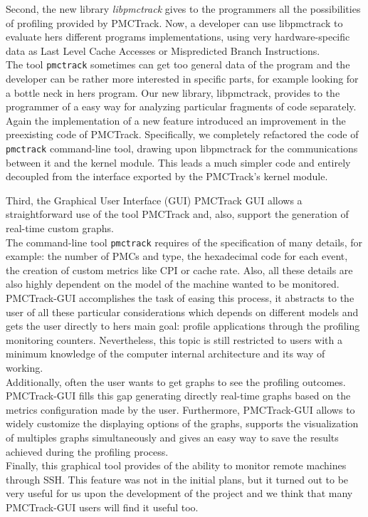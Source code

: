 Second, the new library \textit{libpmctrack} gives to the programmers all the possibilities of profiling provided by PMCTrack. Now, a developer can use libpmctrack to evaluate hers different programs implementations, using very hardware-specific data as Last Level Cache Accesses or Mispredicted Branch Instructions.\\%
The tool \texttt{pmctrack} sometimes can get too general data of the program and the developer can be rather more interested in specific parts, for example looking for a bottle neck in hers program. Our new library, libpmctrack, provides to the programmer of a easy way for analyzing particular fragments of code separately.\\%
Again the implementation of a new feature introduced an improvement in the preexisting code of PMCTrack. Specifically, we completely refactored the code of \texttt{pmctrack} command-line tool, drawing upon libpmctrack for the communications between it and the kernel module. This leads a much simpler code and entirely decoupled from the interface exported by the PMCTrack's kernel module.

Third, the Graphical User Interface (GUI) PMCTrack GUI allows a straightforward use of the tool PMCTrack and, also, support the generation of real-time custom graphs.\\
The command-line tool \texttt{pmctrack} requires of the specification of many details, for example: the number of PMCs and type, the hexadecimal code for each event, the creation of custom metrics like CPI or cache rate. Also, all these details are also highly dependent on the model of the machine wanted to be monitored. PMCTrack-GUI accomplishes the task of easing this process, it abstracts to the user of all these particular considerations which depends on different models and gets the user directly to hers main goal: profile applications through the profiling monitoring counters. Nevertheless, this topic is still restricted to users with a minimum knowledge of the computer internal architecture and its way of working.\\
Additionally, often the user wants to get graphs to see the profiling outcomes. PMCTrack-GUI fills this gap generating directly real-time graphs based on the metrics configuration made by the user. Furthermore, PMCTrack-GUI allows to widely customize the displaying options of the graphs, supports the visualization of multiples graphs simultaneously and gives an easy way to save the results achieved during the profiling process.\\
Finally, this graphical tool provides of the ability to monitor remote machines through SSH. This feature was not in the initial plans, but it turned out to be very useful for us upon the development of the project and we think that many PMCTrack-GUI users will find it useful too.

